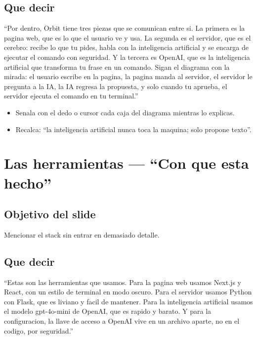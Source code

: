 \documentclass[12pt,a4paper]{article}
\begin{document}
\subsection{Que decir}
\begin{frasebox}
``Por dentro, Orbit tiene tres piezas que se comunican entre si. La primera es la pagina web, que es lo que el usuario ve y usa. La segunda es el servidor, que es el cerebro: recibe lo que tu pides, habla con la inteligencia artificial y se encarga de ejecutar el comando con seguridad. Y la tercera es OpenAI, que es la inteligencia artificial que transforma tu frase en un comando. Sigan el diagrama con la mirada: el usuario escribe en la pagina, la pagina manda al servidor, el servidor le pregunta a la IA, la IA regresa la propuesta, y solo cuando tu aprueba, el servidor ejecuta el comando en tu terminal.''
\end{frasebox}

\begin{itemize}
  \item Senala con el dedo o cursor cada caja del diagrama mientras lo explicas.
  \item Recalca: ``la inteligencia artificial nunca toca la maquina; solo propone texto''.
\end{itemize}

\section{Las herramientas --- ``Con que esta hecho''}
\subsection{Objetivo del slide}
Mencionar el stack sin entrar en demasiado detalle.

\subsection{Que decir}
\begin{frasebox}
``Estas son las herramientas que usamos. Para la pagina web usamos Next.js y React, con un estilo de terminal en modo oscuro. Para el servidor usamos Python con Flask, que es liviano y facil de mantener. Para la inteligencia artificial usamos el modelo gpt-4o-mini de OpenAI, que es rapido y barato. Y para la configuracion, la llave de acceso a OpenAI vive en un archivo aparte, no en el codigo, por seguridad.''
\end{frasebox}
\end{document}
